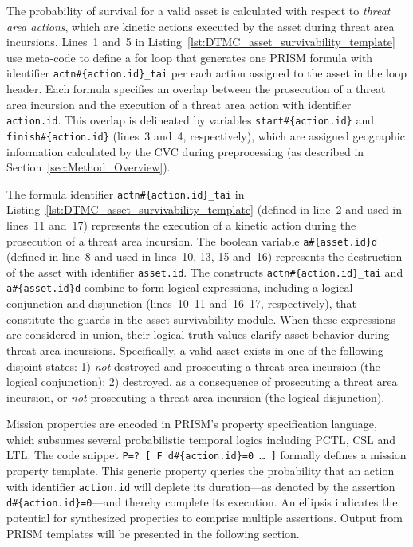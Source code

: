 The probability of survival for a valid asset is calculated with respect to \emph{threat area actions}, which are kinetic actions executed by the asset during threat area incursions. Lines~1 and~5 in Listing~\ref{lst:DTMC_asset_survivability_template} use meta-code to define a for loop that generates one PRISM formula with identifier \texttt{actn\#\{ac\-tion.id\}\_tai} per each action assigned to the asset in the loop header. Each formula specifies an overlap between the prosecution of a threat area incursion and the execution of a threat area action with identifier \texttt{action.id}. This overlap is delineated by variables \texttt{start\#\{action.id\}} and \texttt{finish\#\{action.id\}} (lines~3 and~4, respectively), which are assigned geographic information calculated by the CVC during preprocessing (as described in Section~\ref{sec:Method_Overview}).

The formula identifier \texttt{actn\#\{action.id\}\_tai} in Listing~\ref{lst:DTMC_asset_survivability_template} (defined in line~2 and used in lines~11 and~17) represents the execution of a kinetic action during the prosecution of a threat area incursion. The boolean variable \texttt{a\#\{asset.id\}d} (defined in line~8 and used in lines~10, 13, 15 and~16) represents the destruction of the asset with identifier \texttt{asset.id}. The constructs \texttt{actn\#\{action.id\}\_tai} and \texttt{a\#\{asset.id\}d} combine to form logical expressions, including a logical conjunction and disjunction (lines~10--11 and~16--17, respectively), that constitute the guards in the asset survivability module. When these expressions are considered in union, their logical truth values clarify asset behavior during threat area incursions. Specifically, a valid asset exists in one of the following disjoint states: 1) \emph{not} destroyed and prosecuting a threat area incursion (the logical conjunction); 2) destroyed, as a consequence of prosecuting a threat area incursion, or \emph{not} prosecuting a threat area incursion (the logical disjunction).

Mission properties are encoded in PRISM's property specification language, which subsumes several probabilistic temporal logics including PCTL, CSL and LTL\@. The code snippet \texttt{P=? [ F d\#\{action.id\}=0 \ldots\ ]} formally defines a mission property template. This generic property queries the probability that an action with identifier \texttt{action.id} will deplete its duration---as denoted by the assertion \texttt{d\#\{ac\-tion.id\}=0}---and thereby complete its execution. An ellipsis indicates the potential for synthesized properties to comprise multiple assertions. Output from PRISM templates will be presented in the following section.
